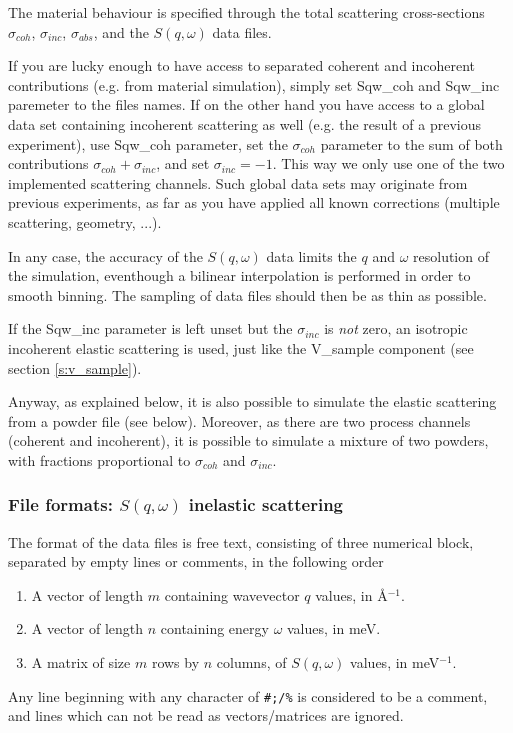 The material behaviour is specified through the total scattering cross-sections $\sigma_{coh}$, $\sigma_{inc}$, $\sigma_{abs}$, and the $S(q, \omega)$ data files.

If you are lucky enough to have access to separated coherent and incoherent contributions (e.g. from material simulation), simply set Sqw\_coh and Sqw\_inc paremeter to the files names. If on the other hand you have access to a global data set containing incoherent scattering as well (e.g. the result of a previous experiment), use Sqw\_coh parameter, set the $\sigma_{coh}$ parameter to the sum of both contributions $\sigma_{coh}+\sigma_{inc}$, and set $\sigma_{inc}=-1$. This way we only use one of the two implemented  scattering channels. Such global data sets may originate from previous experiments, as far as you have applied all known corrections (multiple scattering, geometry, ...).

In any case, the accuracy of the $S(q, \omega)$ data limits the $q$ and $\omega$ resolution of the simulation, eventhough a bilinear interpolation is performed in order to smooth binning. The sampling of data files should then be as thin as possible.

If the Sqw\_inc parameter is left unset but the $\sigma_{inc}$ is \emph{not} zero, an isotropic incoherent elastic scattering is used, just like the V\_sample component (see section \ref{s:v_sample}).

Anyway, as explained below, it is also possible to simulate the elastic scattering from a powder file (see below). Moreover, as there are two process channels (coherent and incoherent), it is possible to simulate a mixture of two powders, with fractions proportional to $\sigma_{coh}$ and $\sigma_{inc}$.

\subsubsection{File formats: $S(q,\omega)$ inelastic scattering}

The format of the data files is free text, consisting of three numerical block, separated by empty lines or comments, in the following order
\begin{enumerate}
\item A vector of length $m$ containing wavevector $q$ values, in \AA$^{-1}$.
\item A vector of length $n$ containing energy $\omega$ values, in meV.
\item A matrix of size $m$ rows by $n$ columns, of $S(q, \omega)$ values, in meV$^{-1}$.
\end{enumerate}
Any line beginning with any character of \verb+#;/%+ is considered to be a comment, and lines which can not be read as vectors/matrices are ignored.

